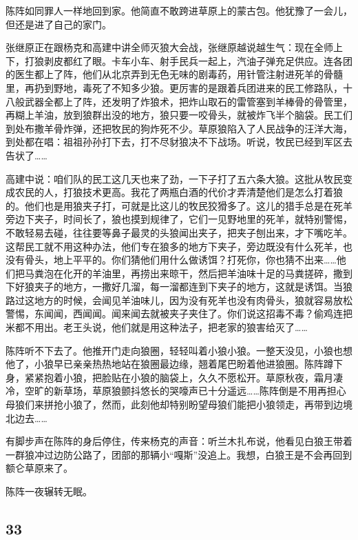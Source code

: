 \par 
\par 陈阵如同罪人一样地回到家。他简直不敢跨进草原上的蒙古包。他犹豫了一会儿，但还是进了自己的家门。
\par 张继原正在跟杨克和高建中讲全师灭狼大会战，张继原越说越生气：现在全师上下，打狼剥皮都红了眼。卡车小车、射手民兵一起上，汽油子弹充足供应。连各团的医生都上了阵，他们从北京弄到无色无味的剧毒药，用针管注射进死羊的骨髓里，再扔到野地，毒死了不知多少狼。更厉害的是跟着兵团进来的民工修路队，十八般武器全都上了阵，还发明了炸狼术，把炸山取石的雷管塞到羊棒骨的骨管里，再糊上羊油，放到狼群出没的地方，狼只要一咬骨头，就被炸飞半个脑袋。民工们到处布撒羊骨炸弹，还把牧民的狗炸死不少。草原狼陷入了人民战争的汪洋大海，到处都在唱：祖祖孙孙打下去，打不尽豺狼决不下战场。听说，牧民已经到军区去告状了……
\par 高建中说：咱们队的民工这几天也来了劲，一下子打了五六条大狼。这批从牧民变成农民的人，打狼技术更高。我花了两瓶白酒的代价才弄清楚他们是怎么打着狼的。他们也是用狼夹子打，可就是比这儿的牧民狡猾多了。这儿的猎手总是在死羊旁边下夹子，时间长了，狼也摸到规律了，它们一见野地里的死羊，就特别警惕，不敢轻易去碰，往往要等鼻子最灵的头狼闻出夹子，把夹子刨出来，才下嘴吃羊。这帮民工就不用这种办法，他们专在狼多的地方下夹子，旁边既没有什么死羊，也没有骨头，地上平平的。你们猜他们用什么做诱饵？打死你，你也猜不出来……他们把马粪泡在化开的羊油里，再捞出来晾干，然后把羊油味十足的马粪搓碎，撒到下好狼夹子的地方，一撒好几溜，每一溜都连到下夹子的地方，这就是诱饵。当狼路过这地方的时候，会闻见羊油味儿，因为没有死羊也没有肉骨头，狼就容易放松警惕，东闻闻，西闻闻。闻来闻去就被夹子夹住了。你们说这招毒不毒？偷鸡连把米都不用出。老王头说，他们就是用这种法子，把老家的狼害给灭了……
\par 陈阵听不下去了。他推开门走向狼圈，轻轻叫着小狼小狼。一整天没见，小狼也想他了，小狼早已亲亲热热地站在狼圈最边缘，翘着尾巴盼着他进狼圈。陈阵蹲下身，紧紧抱着小狼，把脸贴在小狼的脑袋上，久久不愿松开。草原秋夜，霜月凄冷，空旷的新草场，草原狼颤抖悠长的哭嚎声已十分遥远……陈阵倒是不用再担心母狼们来拼抢小狼了，然而，此刻他却特别盼望母狼们能把小狼领走，再带到边境北边去……
\par 有脚步声在陈阵的身后停住，传来杨克的声音：听兰木扎布说，他看见白狼王带着一群狼冲过边防公路了，团部的那辆小“嘎斯”没追上。我想，白狼王是不会再回到额仑草原来了。
\par 陈阵一夜辗转无眠。


\subsection*{33}


